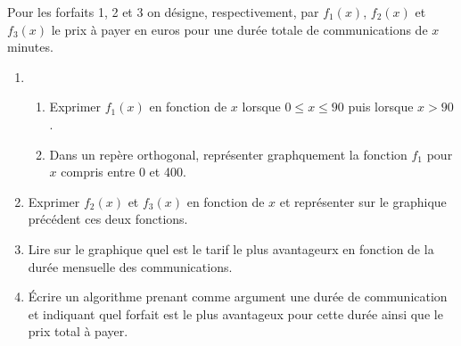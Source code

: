 \begin{landscape}
\begin{multicols}{2}
\noindent Pour les forfaits 1, 2 et 3 on désigne, respectivement, par $f_1(x)$, $f_2(x)$ et $f_3(x)$ le prix à payer en euros pour une durée totale de communications de $x$ minutes.

\begin{enumerate}
	\item
		\begin{enumerate}
			\item Exprimer $f_1(x)$ en fonction de $x$ lorsque $0\leqslant x \leqslant 90$ puis lorsque $x>90$.
			\item Dans un repère orthogonal, représenter graphquement la fonction $f_1$ pour $x$ compris entre 0 et 400.
		\end{enumerate}
	\item Exprimer $f_2(x)$ et $f_3(x)$ en fonction de $x$ et représenter sur le graphique précédent ces deux fonctions.
	\item Lire sur le graphique quel est le tarif le plus avantageurx en fonction de la durée mensuelle des communications.
	\item \'Ecrire un algorithme prenant comme argument une dur\'ee de communication et indiquant quel forfait est le plus avantageux pour cette dur\'ee ainsi que le prix total \`a payer.
\end{enumerate}

\end{multicols}

\end{landscape}

\setcounter{chapter}{\thechaptertemp} %

\renewcommand{\headrulewidth}{0.5pt}
